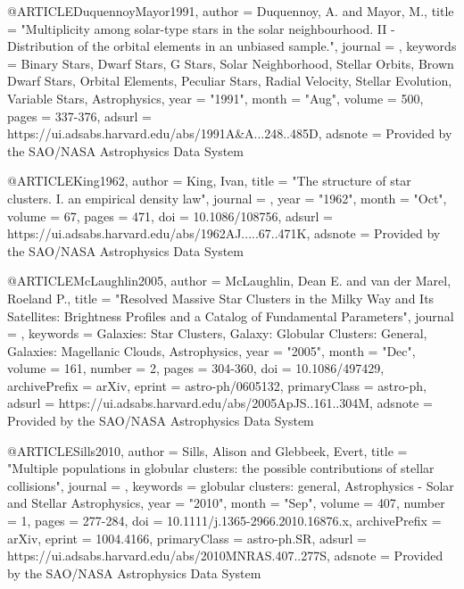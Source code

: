 \documentclass[twocolumn,tighten]{aastex63}
\begin{document}
@ARTICLE{DuquennoyMayor1991,
       author = {{Duquennoy}, A. and {Mayor}, M.},
        title = "{Multiplicity among solar-type stars in the solar neighbourhood. II - Distribution of the orbital elements in an unbiased sample.}",
      journal = {\aap},
     keywords = {Binary Stars, Dwarf Stars, G Stars, Solar Neighborhood, Stellar Orbits, Brown Dwarf Stars, Orbital Elements, Peculiar Stars, Radial Velocity, Stellar Evolution, Variable Stars, Astrophysics},
         year = "1991",
        month = "Aug",
       volume = {500},
        pages = {337-376},
       adsurl = {https://ui.adsabs.harvard.edu/abs/1991A&A...248..485D},
      adsnote = {Provided by the SAO/NASA Astrophysics Data System}
}

@ARTICLE{King1962,
       author = {{King}, Ivan},
        title = "{The structure of star clusters. I. an empirical density law}",
      journal = {\aj},
         year = "1962",
        month = "Oct",
       volume = {67},
        pages = {471},
          doi = {10.1086/108756},
       adsurl = {https://ui.adsabs.harvard.edu/abs/1962AJ.....67..471K},
      adsnote = {Provided by the SAO/NASA Astrophysics Data System}
}

@ARTICLE{McLaughlin2005,
       author = {{McLaughlin}, Dean E. and {van der Marel}, Roeland P.},
        title = "{Resolved Massive Star Clusters in the Milky Way and Its Satellites: Brightness Profiles and a Catalog of Fundamental Parameters}",
      journal = {\apjs},
     keywords = {Galaxies: Star Clusters, Galaxy: Globular Clusters: General, Galaxies: Magellanic Clouds, Astrophysics},
         year = "2005",
        month = "Dec",
       volume = {161},
       number = {2},
        pages = {304-360},
          doi = {10.1086/497429},
archivePrefix = {arXiv},
       eprint = {astro-ph/0605132},
 primaryClass = {astro-ph},
       adsurl = {https://ui.adsabs.harvard.edu/abs/2005ApJS..161..304M},
      adsnote = {Provided by the SAO/NASA Astrophysics Data System}
}

@ARTICLE{Sills2010,
       author = {{Sills}, Alison and {Glebbeek}, Evert},
        title = "{Multiple populations in globular clusters: the possible contributions of stellar collisions}",
      journal = {\mnras},
     keywords = {globular clusters: general, Astrophysics - Solar and Stellar Astrophysics},
         year = "2010",
        month = "Sep",
       volume = {407},
       number = {1},
        pages = {277-284},
          doi = {10.1111/j.1365-2966.2010.16876.x},
archivePrefix = {arXiv},
       eprint = {1004.4166},
 primaryClass = {astro-ph.SR},
       adsurl = {https://ui.adsabs.harvard.edu/abs/2010MNRAS.407..277S},
      adsnote = {Provided by the SAO/NASA Astrophysics Data System}
}
\end{document}
